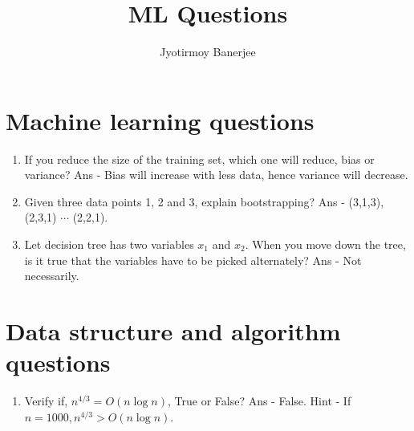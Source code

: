 \documentclass{article}
\title{ML Questions}
\author{Jyotirmoy Banerjee}
\begin{document}
\maketitle

\section{Machine learning questions}

\begin{enumerate}
\item If you reduce the size of the training set, which one will reduce, bias or variance? Ans - Bias will increase with less data, hence variance will decrease.
\item Given three data points 1, 2 and 3, explain bootstrapping? Ans - (3,1,3), (2,3,1) $\cdots$ (2,2,1).
\item Let decision tree has two variables $x_1$ and $x_2$. When you move down the tree, is it true that the variables have to be picked alternately? Ans - Not necessarily. 
\end{enumerate}

\section{Data structure and algorithm questions}

\begin{enumerate}
\item Verify if, $n^{4/3} = O(n \log n)$, True or False? Ans - False. Hint - If $n = 1000, n^{4/3} > O(n \log n)$.
\end{enumerate}
\end{document}
